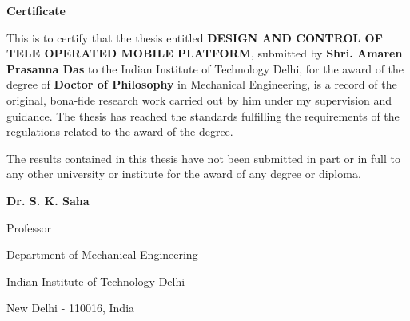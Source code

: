 \doublespacing
\newpage
\thispagestyle{empty}
\mbox{}
\newpage
\thispagestyle{empty}
\begin{center}
\textbf{\Large{Certificate}}
\end{center}

This is to certify that the thesis entitled \textbf{DESIGN AND CONTROL OF TELE OPERATED MOBILE PLATFORM}, submitted by   \textbf{Shri. Amaren Prasanna Das} to the Indian Institute of Technology Delhi, for the award of the degree of \textbf{Doctor of Philosophy} in Mechanical Engineering, is a record of the original, bona-fide research work carried out by him under my supervision and guidance. The thesis has reached the standards fulfilling the requirements of the regulations related to the award of the degree.

The results contained in this thesis have not been submitted in part or in full to any other university or institute for the award of any degree or diploma.
\bigskip
\bigskip
\bigskip
\bigskip
\bigskip


\textbf{Dr. S. K. Saha}

Professor

Department of Mechanical Engineering

Indian Institute of Technology Delhi

New Delhi - 110016, India






\restoregeometry